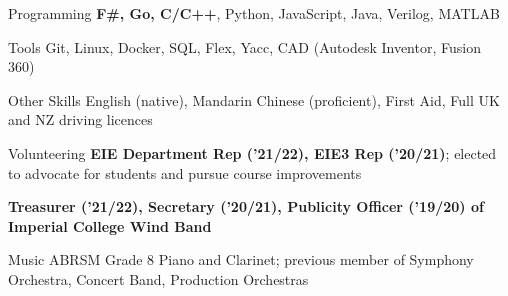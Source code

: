

\begin{cvskills}


  \cvskill
    {Programming} %
    {\textbf{F\#, Go, C/C++}, Python, JavaScript, Java, Verilog, MATLAB} %

  \cvskill
    {Tools} %
    {Git, Linux, Docker, SQL, Flex, Yacc, CAD (Autodesk Inventor, Fusion 360)} %

  \cvskill
    {Other Skills}
    {English (native), Mandarin Chinese (proficient), First Aid, Full UK and NZ driving licences}

  \cvskill
    {Volunteering} %
    {\textbf{EIE Department Rep ('21/22), EIE3 Rep ('20/21)}; elected to advocate for students and pursue course improvements} %

  \cvskill
    {} %
    {\textbf{Treasurer ('21/22), Secretary ('20/21), Publicity Officer ('19/20) of Imperial College Wind Band}} %



  \cvskill
    {Music} %
    {ABRSM Grade 8 Piano and Clarinet; previous member of Symphony Orchestra, Concert Band, Production Orchestras} %


\end{cvskills}
